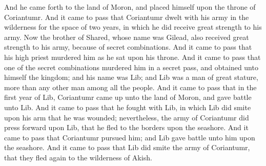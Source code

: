 And he came forth to the land of Moron, and placed himself upon the throne of Coriantumr.
\bverse \iffalse And it came to pass that Coriantumr dwelt with his army in the wilderness for the space of two years, in which he did receive great strength to his army. \fi
And it came to pass that Coriantumr dwelt with his army in the wilderness for the space of two years, in which he did receive great strength to his army.
\bverse \iffalse Now the brother of Shared, whose name was Gilead, also received great strength to his army, because of secret combinations. \fi
Now the brother of Shared, whose name was Gilead, also received great strength to his army, because of secret combinations.
\bverse \iffalse And it came to pass that his high priest murdered him as he sat upon his throne. \fi
And it came to pass that his high priest murdered him as he sat upon his throne.
\bverse \iffalse And it came to pass that one of the secret combinations murdered him in a secret pass, and obtained unto himself the kingdom; and his name was Lib; and Lib was a man of great stature, more than any other man among all the people. \fi
And it came to pass that one of the secret combinations murdered him in a secret pass, and obtained unto himself the kingdom; and his name was Lib; and Lib was a man of great stature, more than any other man among all the people.
\bverse \iffalse And it came to pass that in the first year of Lib, Coriantumr came up unto the land of Moron, and gave battle unto Lib. \fi
And it came to pass that in the first year of Lib, Coriantumr came up unto the land of Moron, and gave battle unto Lib.
\bverse \iffalse And it came to pass that he fought with Lib, in which Lib did smite upon his arm that he was wounded; nevertheless, the army of Coriantumr did press forward upon Lib, that he fled to the borders upon the seashore. \fi
And it came to pass that he fought with Lib, in which Lib did smite upon his arm that he was wounded; nevertheless, the army of Coriantumr did press forward upon Lib, that he fled to the borders upon the seashore.
\bverse \iffalse And it came to pass that Coriantumr pursued him; and Lib gave battle unto him upon the seashore. \fi
And it came to pass that Coriantumr pursued him; and Lib gave battle unto him upon the seashore.
\bverse \iffalse And it came to pass that Lib did smite the army of Coriantumr, that they fled again to the wilderness of Akish. \fi
And it came to pass that Lib did smite the army of Coriantumr, that they fled again to the wilderness of Akish.
